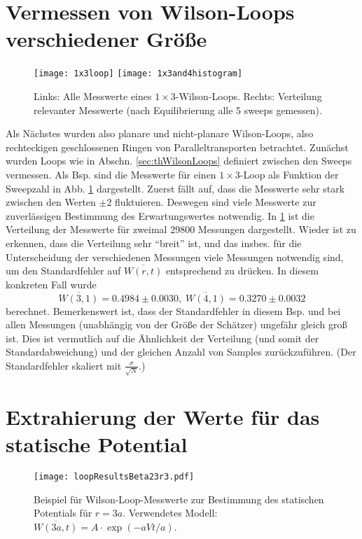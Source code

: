 \section{Vermessen von Wilson-Loops verschiedener Größe}

\begin{figure}[htbp]
    \centering
    \texttt{[image: 1x3loop]}
    \texttt{[image: 1x3and4histogram]}
    \caption{Links: Alle Messwerte eines $1 \times 3$-Wilson-Loops. Rechts:
    Verteilung relevanter Messwerte (nach Equilibrierung alle 5 sweeps gemessen).}
    \label{fig:singleLoops}
\end{figure}

Als Nächstes wurden also planare und nicht-planare Wilson-Loops, also rechteckigen
geschlossenen Ringen von Paralleltransporten betrachtet. Zunächst
wurden Loops wie in Abschn. \ref{sec:thWilsonLoops} definiert zwischen den Sweeps
vermessen. Als Bsp. sind die Messwerte für einen $1 \times 3$-Loop als Funktion der
Sweepzahl in Abb. \ref{fig:singleLoops} dargestellt. Zuerst fällt auf, dass die
Messwerte sehr stark zwischen den Werten $\pm 2$ fluktuieren. Deswegen sind viele
Messwerte zur zuverlässigen Bestimmung des Erwartungswertes notwendig. In
\ref{fig:singleLoops} ist die Verteilung der Messwerte
für zweimal 29800 Messungen dargestellt. Wieder ist zu erkennen, dass die Verteilung
sehr \enquote{breit} ist, und das insbes. für die Unterscheidung der verschiedenen
Messungen viele Messungen notwendig sind, um den Standardfehler auf $\overline{W(r,t)}$
entsprechend zu drücken. In diesem konkreten Fall wurde
\[
    \overline{W(3,1)} = 0.4984 \pm 0.0030, \;
    \overline{W(4,1)} = 0.3270 \pm 0.0032
\]
berechnet. Bemerkenswert ist, dass der Standardfehler in diesem Bsp. und bei allen
Messungen (unabhängig von der Größe der Schätzer) ungefähr gleich groß ist. Dies
ist vermutlich auf die Ähnlichkeit der Verteilung (und somit der Standardabweichung)
und der gleichen Anzahl von Samples zurückzuführen. (Der Standardfehler skaliert mit
$\frac{\sigma}{\sqrt{N}}$.)

\section{Extrahierung der Werte für das statische Potential}

\begin{figure}[htbp]
    \centering
    \texttt{[image: loopResultsBeta23r3.pdf]}
    \caption{Beispiel für Wilson-Loop-Messwerte zur Bestimmung des statischen
    Potentials für $r = 3a$. Verwendetes Modell:
    $\overline{W(3a,t)} = A \cdot \exp(-aV t/a)$.}
    \label{fig:loopResultr3}
\end{figure}

